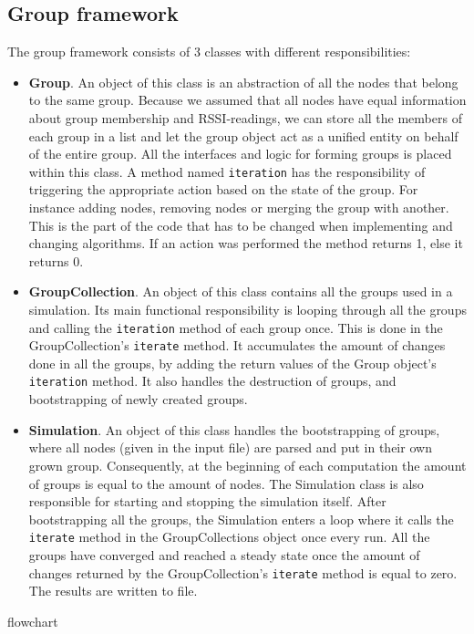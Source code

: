 \subsection{Group framework}
The group framework consists of 3 classes with different responsibilities:
\begin{itemize}
	\item \textbf{Group}. An object of this class is an abstraction of all the nodes that belong to the same group. Because we assumed that all nodes have equal
	information about group membership and RSSI-readings, we can store all the members of each group in a list and let the group object act as a unified entity on
	behalf of the entire group. All the interfaces and logic for forming groups is placed within this class. A method named \verb|iteration|
	has the responsibility of triggering the appropriate action based on the state of the group. For instance adding nodes, removing nodes or merging the group
	with another. This is the part of the code that has to be changed when implementing and changing algorithms. If an action was performed the method returns 1, else it returns 0. 

	\item \textbf{GroupCollection}. An object of this class contains all the groups used in a simulation. Its main functional responsibility is looping through all the groups
	and calling the \verb|iteration| method of each group once. This is done in the GroupCollection's \verb|iterate| method. It accumulates the amount of changes done in all the groups,
	by adding the return values of the Group object's \verb|iteration| method. It also handles the destruction of groups, and bootstrapping of newly created groups.

	\item \textbf{Simulation}. An object of this class handles the bootstrapping of groups, where all nodes (given in the input file) are parsed and
	put in their own grown group. Consequently, at the beginning of each computation the amount of groups is equal to the amount of nodes.
	The Simulation class is also responsible for starting and stopping the simulation itself. After bootstrapping all the groups, the Simulation enters a loop
	where it calls the \verb|iterate| method in the GroupCollections object once every run. All the groups have converged and reached a steady state 
	once the amount of changes returned by the GroupCollection's \verb|iterate| method is equal to zero. The results are written to file.
\end{itemize}
{{flowchart}}
